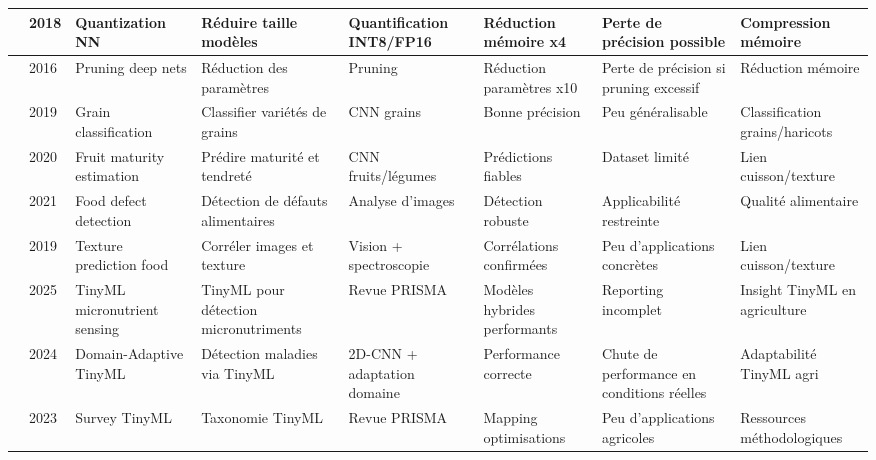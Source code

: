 \begin{table}[H]
\begin{tabularx}{\textwidth}{|p{0.5cm}|p{0.7cm}|p{2.0cm}|X|X|X|X|X|}
        \hline
        \cite{jacob2018quantization} & 2018           & Quantization NN              & Réduire taille modèles           & Quantification INT8/FP16    & Réduction mémoire x4         & Perte de précision possible     & Compression mémoire             \\
        \hline
        \cite{han2016deep}           & 2016           & Pruning deep nets            & Réduction des paramètres         & Pruning                     & Réduction paramètres x10     & Perte de précision si pruning excessif & Réduction mémoire          \\
        \hline
        \cite{patel2019}             & 2019           & Grain classification         & Classifier variétés de grains    & CNN grains                  & Bonne précision              & Peu généralisable               & Classification grains/haricots \\
        \hline
        \cite{kaur2020}              & 2020           & Fruit maturity estimation    & Prédire maturité et tendreté     & CNN fruits/légumes          & Prédictions fiables          & Dataset limité                  & Lien cuisson/texture           \\
        \hline
        \cite{gonzalezbarron2021}    & 2021           & Food defect detection        & Détection de défauts alimentaires & Analyse d’images          & Détection robuste            & Applicabilité restreinte        & Qualité alimentaire            \\
        \hline
        \cite{yu2019}                & 2019           & Texture prediction food      & Corréler images et texture       & Vision + spectroscopie      & Corrélations confirmées      & Peu d’applications concrètes    & Lien cuisson/texture           \\
        \hline
        \cite{moeketsi2025}          & 2025           & TinyML micronutrient sensing & TinyML pour détection micronutriments & Revue PRISMA           & Modèles hybrides performants & Reporting incomplet             & Insight TinyML en agriculture  \\
        \hline
        \cite{kimutaiforster2024}    & 2024           & Domain-Adaptive TinyML       & Détection maladies via TinyML    & 2D-CNN + adaptation domaine & Performance correcte         & Chute de performance en conditions réelles & Adaptabilité TinyML agri \\
        \hline
        \cite{capogrosso2023}        & 2023           & Survey TinyML                & Taxonomie TinyML                 & Revue PRISMA                & Mapping optimisations        & Peu d’applications agricoles    & Ressources méthodologiques     \\

\end{tabularx}
\end{table}
